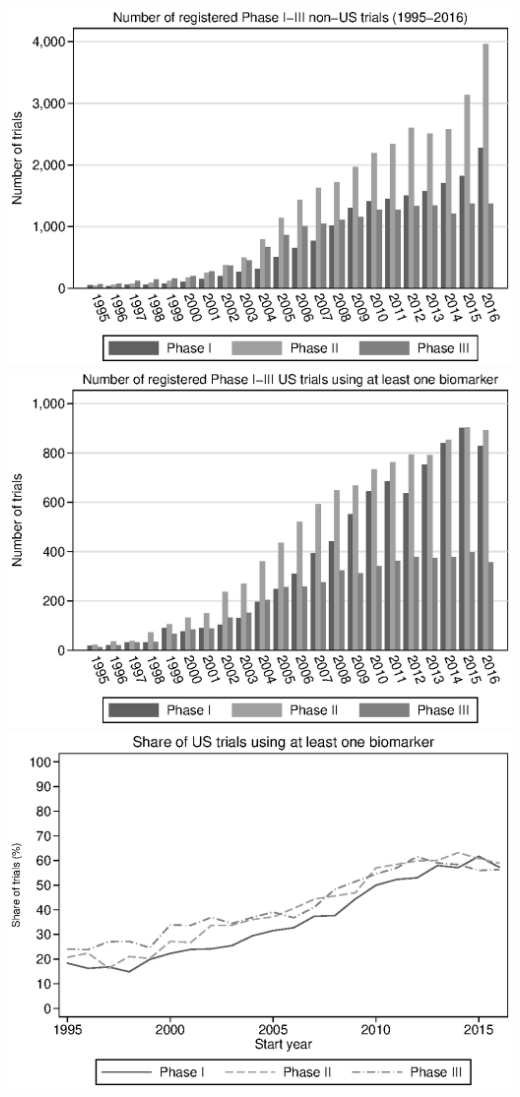 \includegraphics{../figures/A01c-trial_count_by_phase_non-us.eps}
\includegraphics{../figures/A02a-bmkr_count_by_phase_us.eps}
\includegraphics{../figures/A02b-bmkr_share_by_phase_us.eps}
